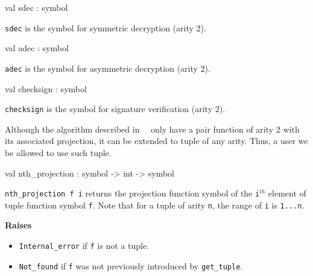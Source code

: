 \label{val:Term.sdec}\begin{ocamldoccode}
val sdec : symbol
\end{ocamldoccode}
\begin{ocamldocdescription}
{\tt{sdec}} is the symbol for symmetric decryption (arity 2).


\end{ocamldocdescription}




\label{val:Term.adec}\begin{ocamldoccode}
val adec : symbol
\end{ocamldoccode}
\begin{ocamldocdescription}
{\tt{adec}} is the symbol for asymmetric decryption (arity 2).


\end{ocamldocdescription}




\label{val:Term.checksign}\begin{ocamldoccode}
val checksign : symbol
\end{ocamldoccode}
\begin{ocamldocdescription}
{\tt{checksign}} is the symbol for signature verification (arity 2).


\end{ocamldocdescription}




Although the algorithm described in~\thesis~ only have a pair function of arity 2 with its
    associated projection, it can be extended to tuple of any arity. Thus, a user we be allowed to 
    use such tuple.



\label{val:Term.nth-underscoreprojection}\begin{ocamldoccode}
val nth_projection : symbol -> int -> symbol
\end{ocamldoccode}
\begin{ocamldocdescription}
{\tt{nth\_projection f i}} returns the projection function symbol of the {\tt{i}}$^{th}$ element of tuple function symbol {\tt{f}}.
    Note that for a tuple of arity {\tt{n}}, the range of {\tt{i}} is {\tt{1...n}}.

{\bf Raises} \begin{itemize}
\item {\tt{Internal\_error}} if {\tt{f}} is not a tuple.
\item {\tt{Not\_found}} if {\tt{f}} was not previously introduced by {\tt{get\_tuple}}.
\end{itemize}



\end{ocamldocdescription}




